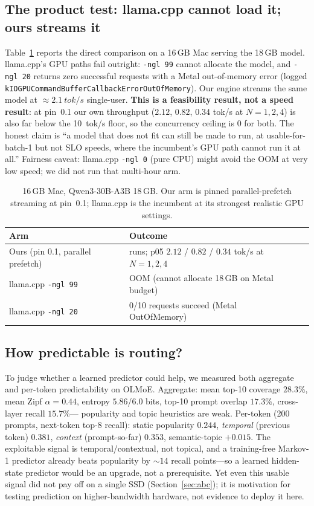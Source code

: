 \documentclass[11pt]{article}
\begin{document}
\subsection{The product test: llama.cpp cannot load it; ours streams it}
\label{sec:product}
Table~\ref{tab:product} reports the direct comparison on a 16\,GB Mac serving the 18\,GB
model. llama.cpp's GPU paths fail outright: \texttt{-ngl 99} cannot allocate the model,
and \texttt{-ngl 20} returns zero successful requests with a Metal out-of-memory error
(logged \texttt{kIOGPUCommandBufferCallbackErrorOutOfMemory}). Our engine streams the
same model at ${\approx}\SI{2.1}{tok/s}$ single-user. \textbf{This is a feasibility
result, not a speed result}: at pin~0.1 our own throughput ($2.12$, $0.82$, $0.34$ tok/s
at $N=1,2,4$) is also far below the \SI{10}{tok/s} floor, so the concurrency ceiling is
$0$ for both. The honest claim is ``a model that does not fit can still be made to run,
at usable-for-batch-1 but not SLO speeds, where the incumbent's GPU path cannot run it at
all.'' Fairness caveat: llama.cpp \texttt{-ngl 0} (pure CPU) might avoid the OOM at very
low speed; we did not run that multi-hour arm.

\begin{table}[t]
\centering
\caption{16\,GB Mac, Qwen3-30B-A3B 18\,GB. Our arm is pinned parallel-prefetch streaming
at pin~0.1; llama.cpp is the incumbent at its strongest realistic GPU settings.}
\label{tab:product}
\small
\begin{tabular}{lll}
\toprule
Arm & Outcome \\
\midrule
Ours (pin 0.1, parallel prefetch) & runs; p05 $2.12$ / $0.82$ / $0.34$ tok/s at $N=1,2,4$ \\
llama.cpp \texttt{-ngl 99}         & OOM (cannot allocate 18\,GB on Metal budget) \\
llama.cpp \texttt{-ngl 20}         & 0/10 requests succeed (Metal OutOfMemory) \\
\bottomrule
\end{tabular}
\end{table}

\subsection{How predictable is routing?}
\label{sec:predict}
To judge whether a learned predictor could help, we measured both aggregate and per-token
predictability on OLMoE. Aggregate: mean top-10 coverage $28.3\%$, mean Zipf $\alpha=0.44$,
entropy $5.86$/$6.0$ bits, top-10 prompt overlap $17.3\%$, cross-layer recall $15.7\%$---
popularity and topic heuristics are weak. Per-token (200 prompts, next-token top-8 recall):
static popularity $0.244$, \emph{temporal} (previous token) $0.381$, \emph{context}
(prompt-so-far) $0.353$, semantic-topic $+0.015$. The exploitable signal is
temporal/contextual, not topical, and a training-free Markov-1 predictor already beats
popularity by ${\sim}14$ recall points---so a learned hidden-state predictor would be an
upgrade, not a prerequisite. Yet even this usable signal did not pay off on a single SSD
(Section~\ref{sec:abc}); it is motivation for testing prediction on higher-bandwidth
hardware, not evidence to deploy it here.
\end{document}
